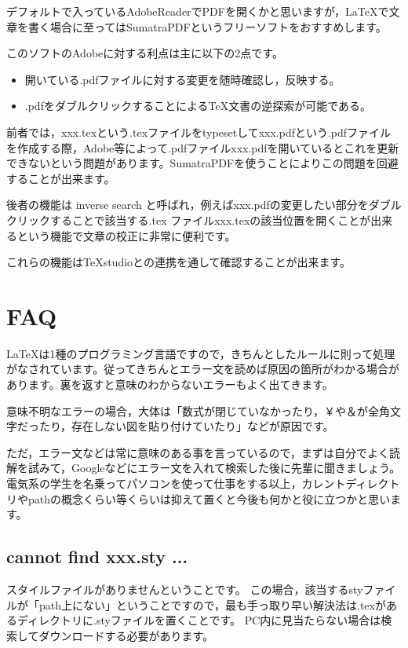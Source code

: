 \documentclass[10pt,a4paper,oneside,twocolumn,fleqn,dvipdfmx]{jsarticle}
\begin{document}
デフォルトで入っているAdobeReaderでPDFを開くかと思いますが，LaTeXで文章を書く場合に至ってはSumatraPDFというフリーソフトをおすすめします。

このソフトのAdobeに対する利点は主に以下の2点です。
\begin{itemize}
	\item 開いている.pdfファイルに対する変更を随時確認し，反映する。
	\item .pdfをダブルクリックすることによる\TeX 文書の逆探索が可能である。
\end{itemize}
前者では，xxx.texという.texファイルをtypesetしてxxx.pdfという.pdfファイルを作成する際，Adobe等によって.pdfファイルxxx.pdfを開いているとこれを更新できないという問題があります。SumatraPDFを使うことによりこの問題を回避することが出来ます。

後者の機能は inverse search と呼ばれ，例えばxxx.pdfの変更したい部分をダブルクリックすることで該当する.tex ファイルxxx.texの該当位置を開くことが出来るという機能で文章の校正に非常に便利です。

これらの機能はTeXstudioとの連携を通して確認することが出来ます。

\section{FAQ}

\LaTeX は1種のプログラミング言語ですので，きちんとしたルールに則って処理がなされています。従ってきちんとエラー文を読めば原因の箇所がわかる場合があります。裏を返すと意味のわからないエラーもよく出てきます。

意味不明なエラーの場合，大体は「数式が閉じていなかったり，￥や＆が全角文字だったり，存在しない図を貼り付けていたり」などが原因です。

ただ，エラー文などは常に意味のある事を言っているので，まずは自分でよく読解を試みて，Googleなどにエラー文を入れて検索した後に先輩に聞きましょう。電気系の学生を名乗ってパソコンを使って仕事をする以上，カレントディレクトリやpathの概念くらい等くらいは抑えて置くと今後も何かと役に立つかと思います。

\subsection{cannot find xxx.sty ...}
スタイルファイルがありませんということです。
この場合，該当するstyファイルが「path上にない」ということですので，最も手っ取り早い解決法は.texがあるディレクトリに.styファイルを置くことです。
PC内に見当たらない場合は検索してダウンロードする必要があります。
\end{document}
